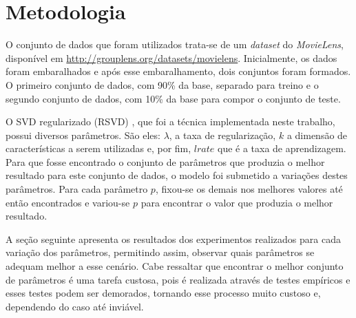 \documentclass[12pt]{article}
\begin{document}

\section{Metodologia}

O conjunto de dados que foram utilizados trata-se de um \textit{dataset} do \textit{MovieLens}, disponível em \url{http://grouplens.org/datasets/movielens}. Inicialmente, os dados foram embaralhados e após esse embaralhamento, dois conjuntos foram formados. O primeiro conjunto de dados, com 90\% da base, separado para treino e o segundo conjunto de dados, com 10\% da base para compor o conjunto de teste. 

O SVD regularizado (RSVD) \cite{funk2006netflix}, que foi a técnica implementada neste trabalho, possui diversos parâmetros. São eles: $\lambda$,  a taxa de regularização, $k$ a dimensão de características a serem utilizadas e, por fim, $lrate$ que é a taxa de aprendizagem. Para que fosse encontrado o conjunto de parâmetros que produzia o melhor resultado para este conjunto de dados, o modelo foi submetido a variações destes parâmetros. Para cada parâmetro $p$, fixou-se os demais nos melhores valores até então encontrados e variou-se $p$ para encontrar o valor que produzia o melhor resultado.

A seção seguinte apresenta os resultados dos experimentos realizados para cada variação dos parâmetros, permitindo assim, observar quais parâmetros se adequam melhor a esse cenário. Cabe ressaltar que encontrar o melhor conjunto de parâmetros é uma tarefa custosa, pois é realizada através de testes empíricos e esses testes podem ser demorados, tornando esse processo muito custoso e, dependendo do caso até inviável.


\end{document}
